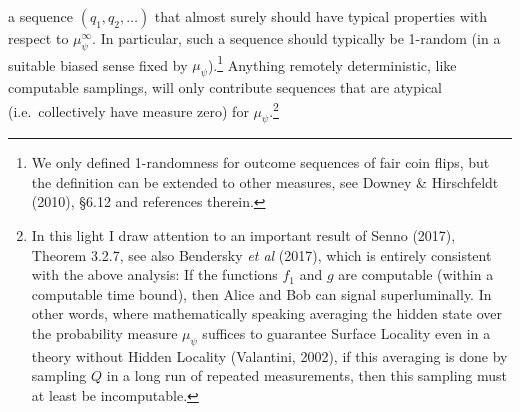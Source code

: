 \documentclass[12pt]{article}
\numberwithin{equation}{section}
\begin{document}
a sequence $(q_1, q_2, \ldots)$ that almost surely should have typical properties with respect to $\mu^{\infty}_{\psi}$.
In particular, such a sequence should typically be 1-random (in a suitable biased sense fixed by  $\mu_{\psi}$).\footnote{\label{noloss} We only defined 1-randomness for outcome sequences of fair coin flips, but  the definition can be extended to other measures, see Downey \& Hirschfeldt (2010), \S 6.12 and references therein.}   Anything remotely deterministic, like computable samplings, will only contribute  sequences that are atypical (i.e.\ collectively have measure zero) for $\mu_{\psi}$.\footnote{\label{31}
In this light I  draw attention to an important result of Senno (2017), Theorem 3.2.7, see also  Bendersky \emph{et al} (2017), which is entirely consistent with the above analysis: If  the functions $f_1$ and $g$  are computable (within a computable time bound), then Alice and Bob can signal superluminally.
In other words, where mathematically speaking averaging the hidden state over the probability measure  $\mu_{\psi}$ suffices to guarantee Surface Locality even in a theory without Hidden Locality (Valantini, 2002), if this averaging is done by sampling $Q$ in a long run of repeated measurements, then this sampling must at least be incomputable.} 
\end{document}
